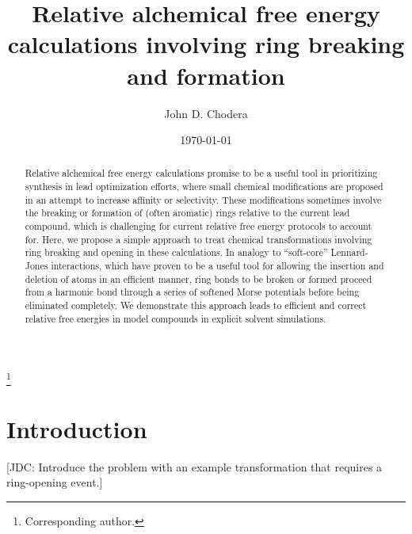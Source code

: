 \documentclass[aps,pre,twocolumn,superscriptaddress,nofootinbib]{revtex4-1}
\begin{document}
\title{Relative alchemical free energy calculations involving ring breaking and formation}

\author{John D. Chodera}
\thanks{Corresponding author.}

\date{\today}

\begin{abstract}
Relative alchemical free energy calculations promise to be a useful tool in prioritizing synthesis in lead optimization efforts, where small chemical modifications are proposed in an attempt to increase affinity or selectivity.
These modifications sometimes involve the breaking or formation of (often aromatic) rings relative to the current lead compound, which is challenging for current relative free energy protocols to account for.
Here, we propose a simple approach to treat chemical transformations involving ring breaking and opening in these calculations.
In analogy to ``soft-core'' Lennard-Jones interactions, which have proven to be a useful tool for allowing the insertion and deletion of atoms in an efficient manner, ring bonds to be broken or formed proceed from a harmonic bond through a series of softened Morse potentials before being eliminated completely.
We demonstrate this approach leads to efficient and correct relative free energies in model compounds in explicit solvent simulations.
\end{abstract}

\maketitle


\section{Introduction}

{\color{red}[JDC: Introduce the problem with an example transformation that requires a ring-opening event.]}
\end{document}

